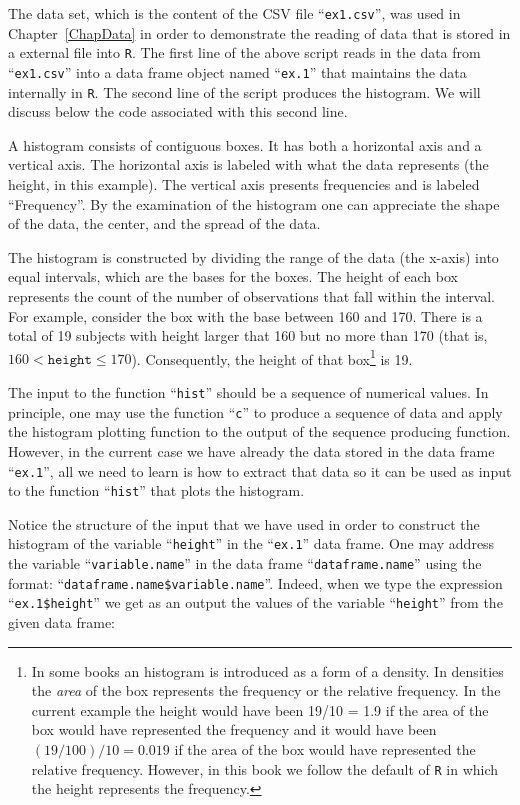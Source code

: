 \documentclass[]{krantz}
\theoremstyle{definition}
\theoremstyle{definition}
\theoremstyle{definition}
\theoremstyle{remark}
\begin{document}
The data set, which is the content of the CSV file ``\texttt{ex1.csv}'', was used
in Chapter~\ref{ChapData} in order to demonstrate the reading of data that
is stored in a external file into \texttt{R}. The first line of the above
script reads in the data from ``\texttt{ex1.csv}'' into a data frame object named
``\texttt{ex.1}'' that maintains the data internally in \texttt{R}. The second line of
the script produces the histogram. We will discuss below the code
associated with this second line.

A histogram consists of contiguous boxes. It has both a horizontal axis
and a vertical axis. The horizontal axis is labeled with what the data
represents (the height, in this example). The vertical axis presents
frequencies and is labeled ``Frequency''. By the examination of the
histogram one can appreciate the shape of the data, the center, and the
spread of the data.

The histogram is constructed by dividing the range of the data (the
x-axis) into equal intervals, which are the bases for the boxes. The
height of each box represents the count of the number of observations
that fall within the interval. For example, consider the box with the
base between 160 and 170. There is a total of 19 subjects with height
larger that 160 but no more than 170 (that is,
\(160 < \texttt{height} \leq 170\)). Consequently, the height of that
box\footnote{In some books an histogram is introduced as a form of a density.
  In densities the \emph{area} of the box represents the frequency or the
  relative frequency. In the current example the height would have
  been 19/10 = 1.9 if the area of the box would have represented the
  frequency and it would have been \((19/100)/10 = 0.019\) if the area
  of the box would have represented the relative frequency. However,
  in this book we follow the default of \texttt{R} in which the height
  represents the frequency.} is 19.

The input to the function ``\texttt{hist}'' should be a sequence of numerical
values. In principle, one may use the function ``\texttt{c}'' to produce a
sequence of data and apply the histogram plotting function to the output
of the sequence producing function. However, in the current case we have
already the data stored in the data frame ``\texttt{ex.1}'', all we need to learn
is how to extract that data so it can be used as input to the function
``\texttt{hist}'' that plots the histogram.

Notice the structure of the input that we have used in order to
construct the histogram of the variable ``\texttt{height}'' in the ``\texttt{ex.1}'' data
frame. One may address the variable ``\texttt{variable.name}'' in the data frame
``\texttt{dataframe.name}'' using the format: ``\texttt{dataframe.name\$variable.name}''.
Indeed, when we type the expression ``\texttt{ex.1\$height}'' we get as an output
the values of the variable ``\texttt{height}'' from the given data frame:
\end{document}
